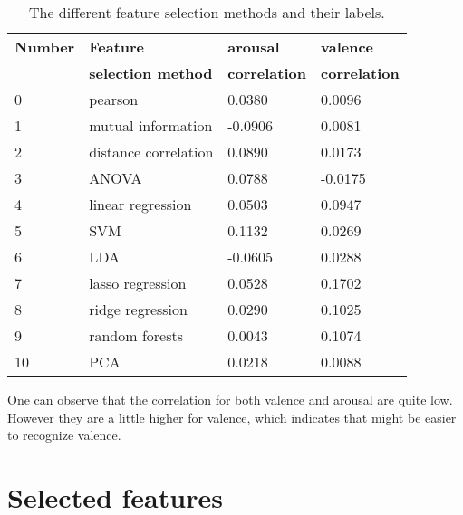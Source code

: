 \begin{table}[H]
\centering
\begin{tabular}{llll}
\textbf{Number} & \textbf{Feature}        & \textbf{arousal} & \textbf{valence} \\
                & \textbf{selection method} & \textbf{correlation} & \textbf{correlation}\\
0               & pearson              & 0.0380    & 0.0096          \\
1               & mutual information   & -0.0906   & 0.0081          \\
2               & distance correlation & 0.0890    & 0.0173          \\
3               & ANOVA                & 0.0788    & -0.0175         \\
4               & linear regression    & 0.0503    & 0.0947          \\
5               & SVM                  & 0.1132    & 0.0269          \\
6               & LDA                  & -0.0605   & 0.0288          \\
7               & lasso regression     & 0.0528    & 0.1702          \\
8               & ridge regression     & 0.0290    & 0.1025          \\
9               & random forests       & 0.0043    & 0.1074          \\
10              & PCA                  & 0.0218    & 0.0088         
\end{tabular}
\caption{The different feature selection methods and their labels\label{corrsCompLbl}.}
\end{table}



One can observe that the correlation for both valence and arousal are quite low. However they are a little higher for valence, which indicates that might be easier to recognize valence.

\section{Selected features}

